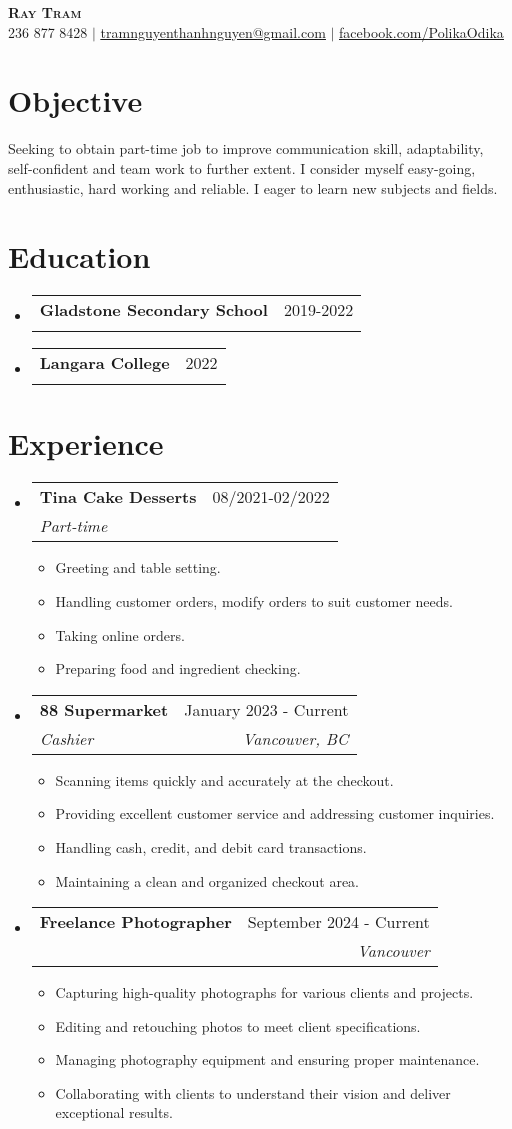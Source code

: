 \documentclass[letterpaper,11pt]{article}
\makeatletter
\newcommand{\resumeItem}[1]{
\item\small{
{#1 \vspace{-2pt}}
}
}
\newcommand{\resumeSubheading}[4]{
\vspace{-2pt}\item
\begin{tabular*}{0.97\textwidth}[t]{l@{\extracolsep{\fill}}r}
\textbf{#1} & #2 \\
\textit{\small#3} & \textit{\small #4} \\
\end{tabular*}\vspace{-7pt}
}
\newcommand{\resumeSubHeadingListStart}{\begin{itemize}[leftmargin=0.15in, label={}]}
\newcommand{\resumeSubHeadingListEnd}{\end{itemize}}
\newcommand{\resumeItemListStart}{\begin{itemize}}
\newcommand{\resumeItemListEnd}{\end{itemize}\vspace{-5pt}}
\makeatother
\begin{document}
\begin{center}
\textbf{\Huge \scshape Ray Tram} \\ \vspace{1pt}
\small 236 877 8428 $|$ \href{mailto:tramnguyenthanhnguyen@gmail.com}{\underline{tramnguyenthanhnguyen@gmail.com}} $|$
\href{https://www.facebook.com/PolikaOdika/}{\underline{facebook.com/PolikaOdika}}
\end{center}


\section{Objective} %
Seeking to obtain part-time job to improve communication skill, adaptability, self-confident and team work to further extent. I consider myself easy-going, enthusiastic, hard working and reliable. I eager to learn new subjects and fields.

\section{Education}
\resumeSubHeadingListStart
\resumeSubheading{Gladstone Secondary School}{2019-2022}{}{}
\resumeSubheading{Langara College}{2022}{}{}
\resumeSubHeadingListEnd

\section{Experience}
\resumeSubHeadingListStart
\resumeSubheading{Tina Cake Desserts}{08/2021-02/2022}{Part-time}{ }
\resumeItemListStart
\resumeItem{Greeting and table setting.}
\resumeItem{Handling customer orders, modify orders to suit customer needs.}
\resumeItem{Taking online orders.}
\resumeItem{Preparing food and ingredient checking.}
\resumeItemListEnd
\resumeSubheading{88 Supermarket}{January 2023 - Current}{Cashier}{Vancouver, BC}
\resumeItemListStart
\resumeItem{Scanning items quickly and accurately at the checkout.}
\resumeItem{Providing excellent customer service and addressing customer inquiries.}
\resumeItem{Handling cash, credit, and debit card transactions.}
\resumeItem{Maintaining a clean and organized checkout area.}
\resumeItemListEnd
\resumeSubheading{Freelance Photographer}{September 2024 - Current}{}{Vancouver}
\resumeItemListStart
\resumeItem{Capturing high-quality photographs for various clients and projects.}
\resumeItem{Editing and retouching photos to meet client specifications.}
\resumeItem{Managing photography equipment and ensuring proper maintenance.}
\resumeItem{Collaborating with clients to understand their vision and deliver exceptional results.}
\resumeItemListEnd
\resumeSubHeadingListEnd
\end{document}
